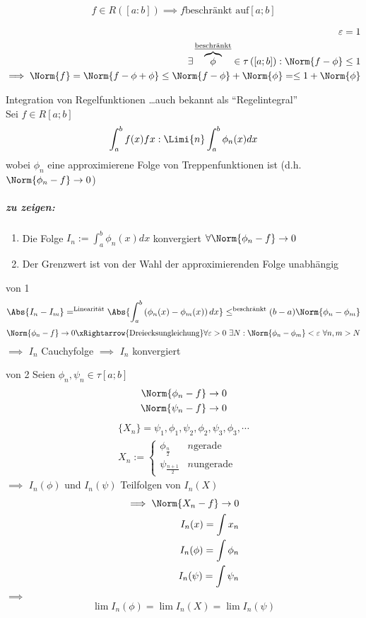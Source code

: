 \begin{Sat}
  \[f\in R\left( [a:b] \right)\implies f \text{beschränkt auf} [a;b]\]
\end{Sat}
\begin{Bew}
  \begin{align*}
    \varepsilon =1\\
    \exists \overbrace{\phi}^{\text{\underline{beschränkt}}}\in\tau\left( [a;b] \right):\Norm{f-\phi}\leq 1\\
    \implies \Norm{f}=\Norm{f-\phi + \phi}\leq \Norm{f-\phi}+\Norm{\phi}=\leq 1+\Norm{\phi}
  \end{align*}
\end{Bew}
\begin{Def}{Integration von Regelfunktionen}
  \ldots auch bekannt als ``Regelintegral''\\
  Sei $f\in R[a;b]$
  \[\int_a^bf(x)fx:\Limi{n}\int^b_a\phi_n(x)dx\]
  wobei $\phi_n$ eine approximierene Folge von Treppenfunktionen ist (d.h. $\Norm{\phi_n-f}\to 0$)
\end{Def}
\subparagraph{zu zeigen:}
\begin{enumerate}
  \item Die Folge $I_n:=\int^b_a\phi_n(x)dx$ konvergiert $\forall \Norm{\phi_n-f}\to 0$
  \item Der Grenzwert ist von der Wahl der approximierenden Folge unabhängig
\end{enumerate}
\begin{Bew}{von 1}
  \[\Abs{I_n-I_m}=^{\text{Linearität}}\Abs{\int^b_a\left( \phi_n(x)-\phi_m(x) \right)dx}\leq^{\text{beschränkt}} (b-a)\Norm{\phi_n-\phi_m}\]
  \[\Norm{\phi_n-f}\to 0 \xRightarrow{\text{Dreiecksungleichung}} \forall\varepsilon>0\ \exists N: \Norm{\phi_n-\phi_m}<\varepsilon\ \forall n,m> N\]
  $\implies$ $I_n$ Cauchyfolge $\implies$ $I_n$ konvergiert
\end{Bew}
\begin{Bew}{von 2}
  Seien $\phi_n, \psi_n\in \tau[a;b]$
  \begin{align*}
    \Norm{\phi_n-f}\to0\\
    \Norm{\psi_n-f}\to0
  \end{align*}
  \begin{align*}
    \{X_n\}=\psi_1,\phi_1,\psi_2,\phi_2,\psi_3,\phi_3,\cdots\\
    X_n:=\begin{cases}
      \phi_{\frac{n}{2}}& n \text{gerade}\\
      \psi_{\frac{n+1}{2}}& n \text{ungerade}
    \end{cases}
  \end{align*}
  $\implies$ $I_n(\phi)$ und $I_n(\psi)$ Teilfolgen von $I_n(X)$
  \begin{align*}
    \implies \Norm{X_n-f}\to 0\\
    I_n(x)=\int x_n\\ I_n(\phi)=\int \phi_n\\ I_n(\psi)=\int \psi_n\\
  \end{align*}
  $\implies$
  \begin{align*}
    \lim I_n(\phi)=\lim I_n(X)=\lim I_n(\psi)
  \end{align*}
\end{Bew}

